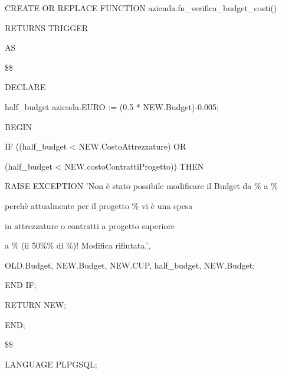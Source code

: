     \ttfamily
        \begin{flushleft}
            \begin{description}
                \item CREATE OR REPLACE FUNCTION azienda.fn\_verifica\_budget\_costi()
                \item RETURNS TRIGGER
                \item AS
                \item \$\$
                \item DECLARE
                \begin{description}
                    \item half\_budget azienda.EURO := (0.5 * NEW.Budget)-0.005;
                \end{description}
                \item BEGIN
                \begin{description}
                    \item IF ((half\_budget < NEW.CostoAttrezzature) OR
                    \item \hspace{0.75cm}(half\_budget < NEW.costoContrattiProgetto)) THEN
                    \vspace{0.2cm}
                    \begin{description}
                        \item RAISE EXCEPTION 'Non è stato possibile modificare il Budget da \% a \%
                        \item \hspace{3cm}perchè attualmente per il progetto \% vi è una spesa
                        \item \hspace{3cm}in attrezzature o contratti a progetto superiore
                        \item \hspace{3cm}a \% (il 50\%\% di \%)! Modifica rifiutata.',
                        \item \hspace{3cm}OLD.Budget, NEW.Budget, NEW.CUP, half\_budget, NEW.Budget;
                    \end{description}
                    \item END IF;
                    \item
                    \item RETURN NEW;
                \end{description}
                \item END;
                \item \$\$
                \item LANGUAGE PLPGSQL;
            \end{description}
        \end{flushleft}
    \normalfont

